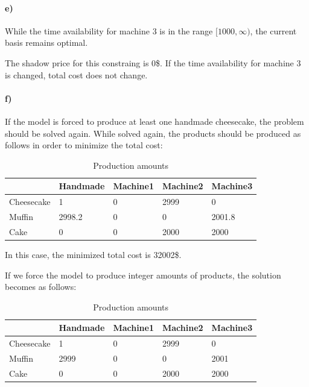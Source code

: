 \documentclass{article}
\begin{document}
\paragraph*{e)}
While the time availability for machine 3 is in the range $[1000, \infty)$, the current basis remains optimal.

The shadow price for this constraing is 0\$.
If the time availability for machine 3 is changed, total cost does not change.

\paragraph*{f)}
If the model is forced to produce at least one handmade cheesecake, the problem should be solved again.
While solved again, the products should be produced as follows in order to minimize the total cost:
\begin{table}[H]
    \centering
    \caption{Production amounts}
    \begin{tabular}{|l|l|l|l|l|}
    \hline
               & Handmade & Machine1 & Machine2 & Machine3 \\ \hline
    Cheesecake & 1        & 0        & 2999     & 0        \\ \hline
    Muffin     & 2998.2     & 0        & 0        & 2001.8     \\ \hline
    Cake       & 0        & 0        & 2000     & 2000     \\ \hline
    \end{tabular}
\end{table}

In this case, the minimized total cost is 32002\$.

If we force the model to produce integer amounts of products, the solution becomes as follows:

\begin{table}[H]
    \centering
    \caption{Production amounts}
    \begin{tabular}{|l|l|l|l|l|}
    \hline
               & Handmade & Machine1 & Machine2 & Machine3 \\ \hline
    Cheesecake & 1        & 0        & 2999     & 0        \\ \hline
    Muffin     & 2999     & 0        & 0        & 2001     \\ \hline
    Cake       & 0        & 0        & 2000     & 2000     \\ \hline
\end{tabular}
\end{table}
\end{document}
